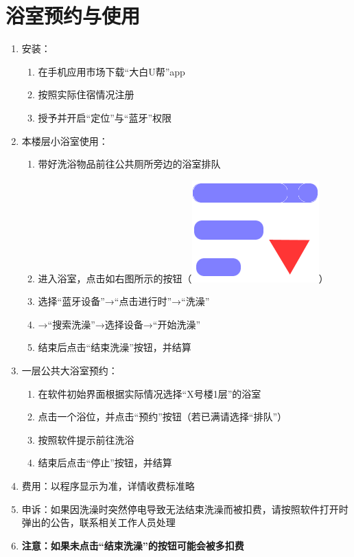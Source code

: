 \section[浴室预约与使用]{浴室预约与使用}
\begin{enumerate}
    \item 安装：
          \begin{enumerate}
              \item 在手机应用市场下载“大白U帮”app
              \item 按照实际住宿情况注册
              \item 授予并开启“定位”与“蓝牙”权限
          \end{enumerate}
    \item 本楼层小浴室使用：
          \begin{enumerate}
              \item 带好洗浴物品前往公共厕所旁边的浴室排队
              \item 进入浴室，点击如右图所示的按钮（\mbox{\includegraphics[height=2.4ex]{bath.png}}）
              \item 选择“蓝牙设备”→“点击进行时”→“洗澡”
              \item →“搜索洗澡”\footnotemark →选择设备\footnotemark →“开始洗澡”
              \item 结束后点击“结束洗澡”按钮，并结算
          \end{enumerate}
    \item 一层公共大浴室预约：
          \begin{enumerate}
              \item 在软件初始界面根据实际情况选择“X号楼1层”的浴室
              \item 点击一个浴位，并点击“预约”按钮（若已满请选择“排队”）
              \item 按照软件提示前往洗浴
              \item 结束后点击“停止”按钮，并结算
          \end{enumerate}
    \item 费用：以程序显示为准，详情收费标准略
    \item 申诉：如果因洗澡时突然停电导致无法结束洗澡而被扣费，请按照软件打开时弹出的公告，联系相关工作人员处理
    \item \textbf{注意：如果未点击“结束洗澡”的按钮可能会被多扣费}
\end{enumerate}


